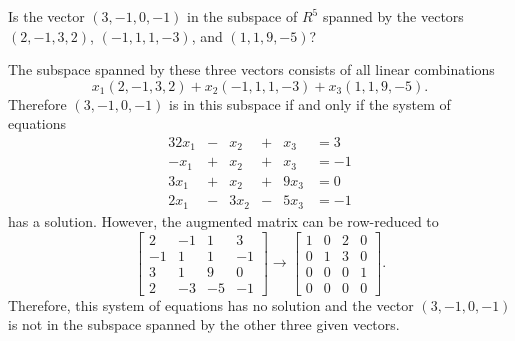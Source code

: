  Is the vector $(3,-1,0,-1)$ in the subspace of $R^5$
spanned by the vectors $(2,-1,3,2)$, $(-1,1,1,-3)$, and $(1,1,9,-5)$?
\begin{solution}
  The subspace spanned by these three vectors consists of all linear
  combinations
  \begin{equation*}
    x_1(2,-1,3,2) + x_2(-1,1,1,-3) + x_3(1,1,9,-5).
  \end{equation*}
  Therefore $(3,-1,0,-1)$ is in this subspace if and only if the
  system of equations
  \begin{alignat*}{3}
    2x_1 &{}-{}& x_2 &{}+{}& x_3 &{}= 3 \\
    -x_1 &{}+{}& x_2 &{}+{}& x_3 &{}= -1 \\
    3x_1 &{}+{}& x_2 &{}+{}& 9x_3 &{}= 0 \\
    2x_1 &{}-{}& 3x_2 &{}-{}& 5x_3 &{}= -1
  \end{alignat*}
  has a solution. However, the augmented matrix can be row-reduced to
  \begin{equation*}
    \begin{bmatrix}
      2 & -1 & 1 & 3 \\
      -1 & 1 & 1 & -1 \\
      3 & 1 & 9 & 0 \\
      2 & -3 & -5 & -1
    \end{bmatrix}
    \rightarrow
    \begin{bmatrix}
      1 & 0 & 2 & 0 \\
      0 & 1 & 3 & 0 \\
      0 & 0 & 0 & 1 \\
      0 & 0 & 0 & 0
    \end{bmatrix}.
  \end{equation*}
  Therefore, this system of equations has no solution and the vector
  $(3,-1,0,-1)$ is not in the subspace spanned by the other three
  given vectors.
\end{solution}

